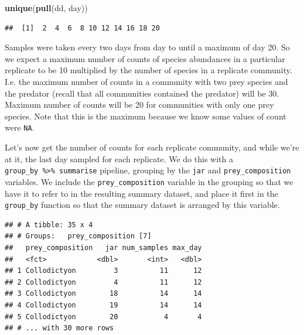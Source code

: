 \documentclass[]{book}
\newenvironment{Shaded}{\begin{snugshade}}{\end{snugshade}}
\newcommand{\DataTypeTok}[1]{\textcolor[rgb]{0.13,0.29,0.53}{#1}}
\newcommand{\KeywordTok}[1]{\textcolor[rgb]{0.13,0.29,0.53}{\textbf{#1}}}
\newcommand{\NormalTok}[1]{#1}
\newcommand{\OperatorTok}[1]{\textcolor[rgb]{0.81,0.36,0.00}{\textbf{#1}}}
\newcommand{\StringTok}[1]{\textcolor[rgb]{0.31,0.60,0.02}{#1}}
\begin{document}
\begin{Shaded}
\begin{Highlighting}[]
\KeywordTok{unique}\NormalTok{(}\KeywordTok{pull}\NormalTok{(dd, day))}
\end{Highlighting}
\end{Shaded}

\begin{verbatim}
##  [1]  2  4  6  8 10 12 14 16 18 20
\end{verbatim}

Samples were taken every two days from day to until a maximum of day 20. So we expect a maximum number of counts of species abundances in a particular replicate to be 10 multiplied by the number of species in a replicate community. I.e. the maximum number of counts in a community with two prey species and the predator (recall that all communities contained the predator) will be 30. Maximum number of counts will be 20 for communities with only one prey species. Note that this is the maximum because we know some values of count were \texttt{NA}.

Let's now get the number of counts for each replicate community, and while we're at it, the last day sampled for each replicate. We do this with a \texttt{group\_by\ \%\textgreater{}\%\ summarise} pipeline, grouping by the \texttt{jar} and \texttt{prey\_composition} variables. We include the \texttt{prey\_composition} variable in the grouping so that we have it to refer to in the resulting summary dataset, and place it first in the \texttt{group\_by} function so that the summary dataset is arranged by this variable.

\begin{Shaded}
\end{Shaded}

\begin{verbatim}
## # A tibble: 35 x 4
## # Groups:   prey_composition [7]
##   prey_composition   jar num_samples max_day
##   <fct>            <dbl>       <int>   <dbl>
## 1 Collodictyon         3          11      12
## 2 Collodictyon         4          11      12
## 3 Collodictyon        18          14      14
## 4 Collodictyon        19          14      14
## 5 Collodictyon        20           4       4
## # ... with 30 more rows
\end{verbatim}
\end{document}
